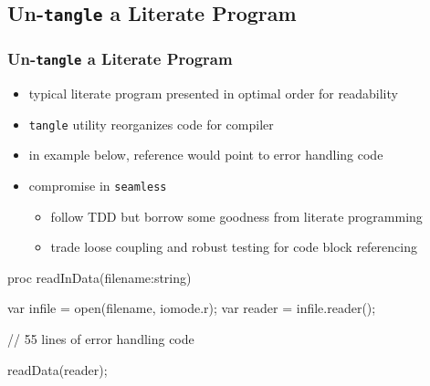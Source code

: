 \documentclass{beamer}
\makeatletter
\newcommand*{\seamless}{\texttt{seamless}\@\xspace}
\makeatother
\begin{document}
\subsection{Un-\texttt{tangle} a Literate Program}
\begin{frame}[fragile]
  \frametitle{Un-\texttt{tangle} a Literate Program}
  \begin{itemize}
    \item typical literate program presented in optimal order for readability 
    \item \texttt{tangle} utility reorganizes code for compiler 
    \item in example below, reference would point to error handling code 
    \item compromise in \seamless 
      \begin{itemize} 
        \item follow TDD but borrow some goodness from literate programming
        \item trade loose coupling and robust testing for code block referencing
      \end{itemize}
  \end{itemize}
  \begin{beamerbox}
    \begin{chapel}
proc readInData(filename:string) {
  var infile = open(filename, iomode.r);
  var reader = infile.reader();

  // 55 lines of error handling code

  readData(reader);
}
    \end{chapel}
  \end{beamerbox}
\end{frame}
\end{document}
